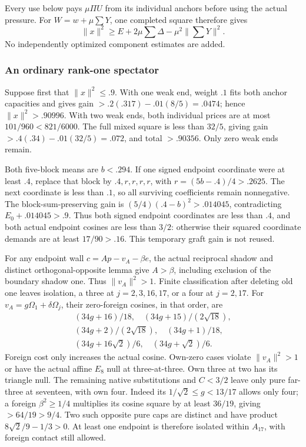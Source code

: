 \documentclass[11pt]{article}
\theoremstyle{definition}
\theoremstyle{remark}
\newcommand{\norm}[1]{\lVert #1\rVert}
\begin{document}
Every use below pays \(\mu\Pi U\) from its individual anchors
before using the actual pressure. For \(W=w+\mu\sum Y\), one
completed square therefore gives
\[
 \norm x^2\ge E+2\mu\sum\Delta-\mu^2\norm{\textstyle\sum Y}^2.
\]
No independently optimized component estimates are added.

\subsubsection{An ordinary rank-one spectator}
Suppose first that \(\norm x^2\le.9\). With one weak end,
weight \(.1\) fits both anchor capacities and gives gain
\(>.2(.317)-.01(8/5)=.0474\); hence
\(\norm x^2>.90996\). With two weak ends, both individual
prices are at most \(101/960<821/6000\). The full mixed square
is less than \(32/5\), giving gain
\(>.4(.34)-.01(32/5)=.072\), and total \(>.90356\).
Only zero weak ends remain.

Both five-block means are \(b<.294\). If one signed endpoint
coordinate were at least \(.4\), replace that block by
\(.4,r,r,r,r\), with \(r=(5b-.4)/4>.2625\).
The next coordinate is less than \(.1\), so all surviving
coefficients remain nonnegative. The block-sum-preserving gain is
\((5/4)(.4-b)^2>.014045\), contradicting
\(E_0+.014045>.9\). Thus both signed endpoint coordinates
are less than \(.4\), and both actual endpoint cosines are less
than \(3/2\): otherwise their squared coordinate demands are
at least \(17/90>.16\). This temporary graft gain is not reused.

For any endpoint wall \(c=Ap-v_A-\beta e\), the actual reciprocal
shadow and distinct orthogonal-opposite lemma give \(A>\beta\),
including exclusion of the boundary shadow one. Thus
\(\norm{v_A}^2>1\). Finite classification after deleting old one
leaves isolation, a three at \(j=2,3,16,17\), or a four at
\(j=2,17\). For \(v_A=g\Omega_1+\delta\Omega_j\), their
zero-foreign cosines, in that order, are
\[
\begin{gathered}
 (34g+16)/18,\quad(34g+15)/(2\sqrt{18}),\\
 (34g+2)/(2\sqrt{18}),\quad(34g+1)/18,\\
 (34g+16\sqrt2)/6,\quad(34g+\sqrt2)/6.
\end{gathered}
\]
Foreign cost only increases the actual cosine. Own-zero cases violate
\(\norm{v_A}^2>1\) or have the actual affine \(E_8\) null at
three-at-three. Own three at two has its triangle null. The remaining
native substitutions and \(C<3/2\) leave only pure far-three at
seventeen, with own four. Indeed its \(1/\sqrt2\le g<13/17\)
allows only four; a foreign \(\beta^2\ge1/4\) multiplies its
cosine square by at least \(36/19\), giving \(>64/19>9/4\).
Two such opposite pure caps are distinct and have product
\(8\sqrt2/9-1/3>0\). At least one endpoint is therefore isolated
within \(A_{17}\), with foreign contact still allowed.
\end{document}
